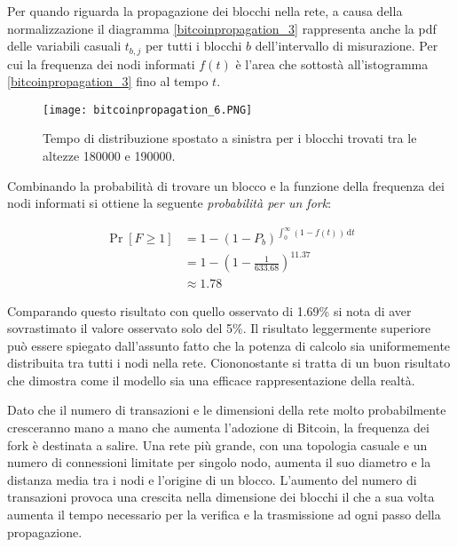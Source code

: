 Per quando riguarda la propagazione dei blocchi nella rete, a causa della normalizzazione il diagramma \ref{bitcoinpropagation_3} rappresenta anche la \gls{pdf} delle variabili casuali $t_{b,j}$ per tutti i blocchi $b$ dell'intervallo di misurazione. Per cui la frequenza dei nodi informati $f(t)$ è l'area che sottostà all'istogramma \ref{bitcoinpropagation_3} fino al tempo $t$.

\begin{figure}[htbp]
\centering
\texttt{[image: bitcoinpropagation\_6.PNG]}
\caption[Distribuzione dei blocchi nel tempo]{Tempo di distribuzione spostato a sinistra per i blocchi trovati tra le altezze 180000 e 190000.\label{bitcoinpropagation_6}}
\end{figure}

Combinando la probabilità di trovare un blocco e la funzione della frequenza dei nodi informati si ottiene la seguente \emph{probabilità per un fork}:

\begin{equation*}
\begin{aligned}
    \Pr [F \geq 1 ] &= 1 - (1 - P_b)^{\int_{0}^{\infty} \! (1 - f(t)) \, \mathrm{d} t} \\
    &= 1 - (1 - \frac{1}{633.68})^{11.37} \\
    &\approx 1.78%
\end{aligned}
\end{equation*}

Comparando questo risultato con quello osservato di 1.69\% si nota di aver sovrastimato il valore osservato solo del 5\%. Il risultato leggermente superiore può essere spiegato dall'assunto fatto che la potenza di calcolo sia uniformemente distribuita tra tutti i nodi nella rete. Ciononostante si tratta di un buon risultato che dimostra come il modello sia una efficace rappresentazione della realtà.

Dato che il numero di transazioni e le dimensioni della rete molto probabilmente cresceranno mano a mano che aumenta l'adozione di Bitcoin, la frequenza dei fork è destinata a salire. Una rete più grande, con una topologia casuale e un numero di connessioni limitate per singolo nodo, aumenta il suo diametro e la distanza media tra i nodi e l'origine di un blocco. L'aumento del numero di transazioni provoca una crescita nella dimensione dei blocchi il che a sua volta aumenta il tempo necessario per la verifica e la trasmissione ad ogni passo della propagazione.

